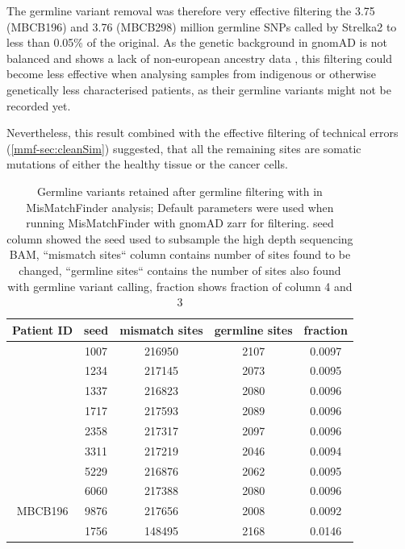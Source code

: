 The germline variant removal was therefore very effective filtering the 3.75 (MBCB196) and 3.76 (MBCB298) million germline SNPs called by Strelka2 to less than 0.05\% of the original. As the genetic background in gnomAD is not balanced and shows a lack of non-european ancestry data \cite{Tiao2020}, this filtering could become less effective when analysing samples from indigenous or otherwise genetically less characterised patients, as their germline variants might not be recorded yet.

Nevertheless, this result combined with the effective filtering of technical errors (\autoref{mmf-sec:cleanSim}) suggested, that all the remaining sites are somatic mutations of either the healthy tissue or the cancer cells.

\begin{table}
\caption[Germline variants retained after germline filtering]{Germline variants retained after germline filtering with in MisMatchFinder analysis; Default parameters were used when running MisMatchFinder with gnomAD zarr for filtering. seed column showed the seed used to subsample the high depth sequencing BAM, ``mismatch sites`` column contains number of sites found to be changed, ``germline sites`` contains the number of sites also found with germline variant calling, fraction shows fraction of column 4 and 3}\label{tab:mmf-germlineArtifacts}
\centering
\begin{tabular}{|c|c|c|c|c|}
\toprule
\hline
\textbf{Patient ID} & \textbf{seed} & \textbf{mismatch sites} & \textbf{germline sites} & \textbf{fraction} \\
\hline
 & \num{1007} & \num{216950} &  \num{2107} & \num{0.0097}\\ 
 & \num{1234} & \num{217145} &  \num{2073} & \num{0.0095}\\ 
 & \num{1337} & \num{216823} &  \num{2080} & \num{0.0096}\\ 
 & \num{1717} & \num{217593} &  \num{2089} & \num{0.0096}\\ 
 & \num{2358} & \num{217317} &  \num{2097} & \num{0.0096}\\ 
 & \num{3311} & \num{217219} &  \num{2046} & \num{0.0094}\\ 
 & \num{5229} & \num{216876} &  \num{2062} & \num{0.0095}\\ 
 & \num{6060} & \num{217388} &  \num{2080} & \num{0.0096}\\ 
\multirow{-9}{*}{MBCB196} & \num{9876} & \num{217656} &  \num{2008} & \num{0.0092}\\ 
\hline
 & \num{1756} & \num{148495} &  \num{2168} & \num{0.0146}\\ 

\end{tabular}
\end{table}

